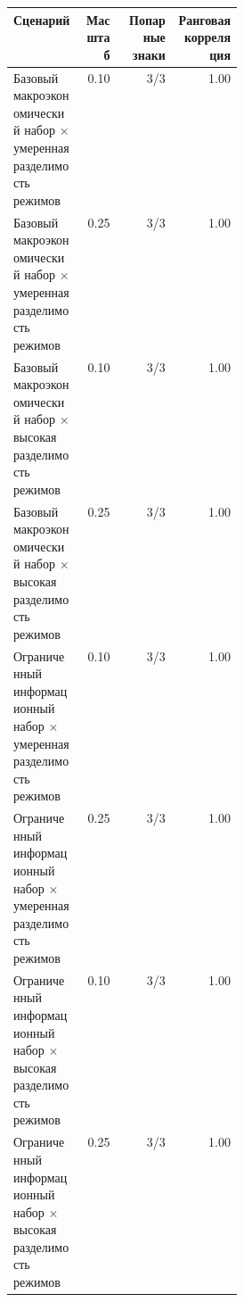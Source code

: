 \begin{tabular}{p{0.30\linewidth}rrr}
\toprule
Сценарий & Масштаб & Попарные знаки & Ранговая корреляция \\
\midrule
Базовый макроэкономический набор × умеренная разделимость режимов & 0.10 & 3/3 & 1.00 \\
Базовый макроэкономический набор × умеренная разделимость режимов & 0.25 & 3/3 & 1.00 \\
Базовый макроэкономический набор × высокая разделимость режимов & 0.10 & 3/3 & 1.00 \\
Базовый макроэкономический набор × высокая разделимость режимов & 0.25 & 3/3 & 1.00 \\
Ограниченный информационный набор × умеренная разделимость режимов & 0.10 & 3/3 & 1.00 \\
Ограниченный информационный набор × умеренная разделимость режимов & 0.25 & 3/3 & 1.00 \\
Ограниченный информационный набор × высокая разделимость режимов & 0.10 & 3/3 & 1.00 \\
Ограниченный информационный набор × высокая разделимость режимов & 0.25 & 3/3 & 1.00 \\
\bottomrule
\end{tabular}